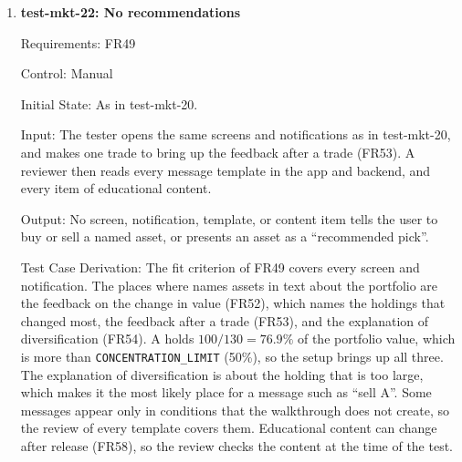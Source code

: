 \documentclass[12pt, titlepage]{article}
\begin{document}
\begin{enumerate}
Input: The tester opens the same screens and notifications as in test-mkt-20.

Output: The tester can tell every gain from every loss, each shown with a sign
or a text label.

Test Case Derivation: The fit criterion of FR44 shows the display in
greyscale, which removes the difference between a gain shown only in green and
a loss shown only in red. A's gain and B's loss are both 25\%, so their size
cannot tell them apart, and only a sign or label can. The setup from
test-mkt-20 puts a gain or a loss on every screen that shows a return.

How test will be performed: The tester turns on the phone's greyscale setting,
opens each screen and notification, and records any gain or loss that cannot
be told apart from the other without colour.

\item{\textbf{test-mkt-22: No recommendations}\\}

Requirements: FR49

Control: Manual

Initial State: As in test-mkt-20.

Input: The tester opens the same screens and notifications as in test-mkt-20,
and makes one trade to bring up the feedback after a trade (FR53). A reviewer
then reads every message template in the app and backend, and every item of
educational content.

Output: No screen, notification, template, or content item tells the user to
buy or sell a named asset, or presents an asset as a ``recommended pick''.

Test Case Derivation: The fit criterion of FR49 covers every screen and
notification. The places where \progname{} names assets in text about the
portfolio are the feedback on the change in value (FR52), which names the
holdings that changed most, the feedback after a trade (FR53), and the
explanation of diversification (FR54). A holds $100 / 130 = 76.9\%$ of the
portfolio value, which is more than \texttt{CONCENTRATION\_LIMIT} (50\%), so
the setup brings up all three. The explanation of diversification is about
the holding that is too large, which makes it the most likely place for a
message such as ``sell A''. Some messages appear only in conditions that the
walkthrough does not create, so the review of every template covers them.
Educational content can change after release (FR58), so the review checks the
content at the time of the test.


\end{enumerate}
\end{document}
